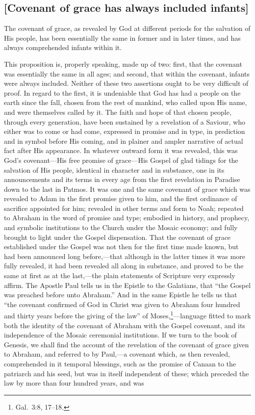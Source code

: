 \documentclass[
  english,
]{book}
\begin{document}
\hypertarget{covenant-of-grace-has-always-included-infants}{%
\subsection{{[}Covenant of grace has always included infants{]}}\label{covenant-of-grace-has-always-included-infants}}

The covenant of grace, as revealed by God at different periods for the salvation of His people, has been essentially the same in former and in later times, and has always comprehended infants within it.

This proposition is, properly speaking, made up of two: first, that the covenant was essentially the same in all ages; and second, that within the covenant, infants were always included. Neither of these two assertions ought to be very difficult of proof. In regard to the first, it is undeniable that God has had a people on the earth since the fall, chosen from the rest of mankind, who called upon His name, and were themselves called by it. The faith and hope of that chosen people, through every generation, have been sustained by a revelation of a Saviour, who either was to come or had come, expressed in promise and in type, in prediction and in symbol before His coming, and in plainer and ampler narrative of actual fact after His appearance. In whatever outward form it was revealed, this was God's covenant---His free promise of grace---His Gospel of glad tidings for the salvation of His people, identical in character and in substance, one in its announcements and its terms in every age from the first revelation in Paradise down to the last in Patmos. It was one and the same covenant of grace which was revealed to Adam in the first promise given to him, and the first ordinance of sacrifice appointed for him; revealed in other terms and form to Noah; repeated to Abraham in the word of promise and type; embodied in history, and prophecy, and symbolic institutions to the Church under the Mosaic economy; and fully brought to light under the Gospel dispensation. That the covenant of grace established under the Gospel was not then for the first time made known, but had been announced long before,---that although in the latter times it was more fully revealed, it had been revealed all along in substance, and proved to be the same at first as at the last,---the plain statements of Scripture very expressly affirm. The Apostle Paul tells us in the Epistle to the Galatians, that ``the Gospel was preached before unto Abraham.'' And in the same Epistle he tells us that ``the covenant confirmed of God in Christ was given to Abraham four hundred and thirty years before the giving of the law'' of Moses,\footnote{Gal.~3:8, 17--18.}---language fitted to mark both the identity of the covenant of Abraham with the Gospel covenant, and its independence of the Mosaic ceremonial institutions. If we turn to the book of Genesis, we shall find the account of the revelation of the covenant of grace given to Abraham, and referred to by Paul,---a covenant which, as then revealed, comprehended in it temporal blessings, such as the promise of Canaan to the patriarch and his seed, but was in itself independent of these; which preceded the law by more than four hundred years, and was 
\end{document}
